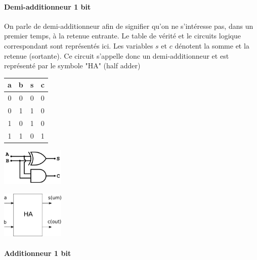 \paragraph{Demi-additionneur 1 bit}
On parle de demi-additionneur afin de signifier qu'on ne s'intéresse pas, dans un premier temps, à la retenue entrante.
Le table de vérité et le circuits logique correspondant sont représentés ici. Les variables $s$ et $c$ dénotent la somme et la retenue (sortante).
Ce circuit s'appelle donc un demi-additionneur et est représenté par le symbole "HA" (half adder)
\begin{center}
   \begin{minipage}[t]{4cm}
     \vspace{0pt}
     \centering
     \begin{tabular}{|c|c||c|c|}
       \hline
       a & b & s & c \\ \hline
       0 & 0 & 0 & 0    \\ \hline
       0 & 1 & 1 & 0    \\ \hline
       1 & 0 & 1 & 0    \\ \hline
       1 & 1 & 0 & 1    \\ \hline
     \end{tabular}
   \end{minipage}%
   \begin{minipage}[t]{5cm}
     \vspace{0pt}
     \centering
     \includegraphics[width=3cm]{./figures/half_adder.jpg}
   \end{minipage}
   \begin{minipage}[t]{5cm}
     \vspace{0pt}
     \centering
     \includegraphics[width=3cm]{./figures/ha.png}
   \end{minipage}

\end{center} %



\paragraph{Additionneur 1 bit}

